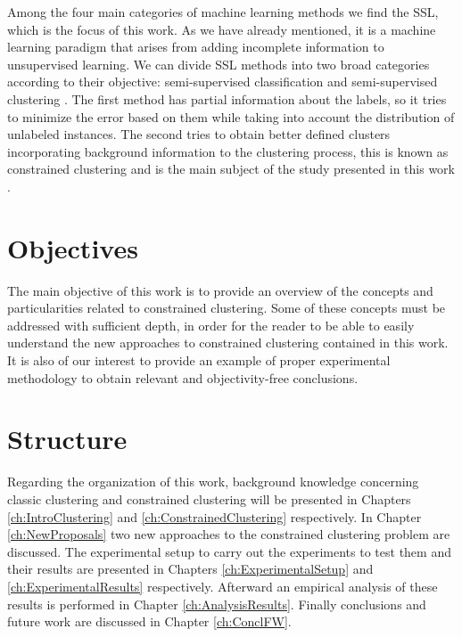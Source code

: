 Among the four main categories of machine learning methods we find the \acf{SSL}, which is the focus of this work. As we have already mentioned, it is a machine learning paradigm that arises from adding incomplete information to unsupervised learning. We can divide \acs{SSL} methods into two broad categories according to their objective: semi-supervised classification and semi-supervised clustering \cite{chapelle2009semi}. The first method has partial information about the labels, so it tries to minimize the error based on them while taking into account the distribution of unlabeled instances. The second tries to obtain better defined clusters incorporating background information to the clustering process, this is known as constrained clustering and is the main subject of the study presented in this work \cite{triguero2015self}.

\section{Objectives}

The main objective of this work is to provide an overview of the concepts and particularities related to constrained clustering. Some of these concepts must be addressed with sufficient depth, in order for the reader to be able to easily understand the new approaches to constrained clustering contained in this work. It is also of our interest to provide an example of proper experimental methodology to obtain relevant and objectivity-free conclusions.

\section{Structure}

Regarding the organization of this work, background knowledge concerning classic clustering and constrained clustering will be presented in Chapters \ref{ch:IntroClustering} and \ref{ch:ConstrainedClustering} respectively. In Chapter \ref{ch:NewProposals} two new approaches to the constrained clustering problem are discussed. The experimental setup to carry out the experiments to test them and their results are presented in Chapters \ref{ch:ExperimentalSetup} and \ref{ch:ExperimentalResults} respectively. Afterward an empirical analysis of these results is performed in Chapter \ref{ch:AnalysisResults}. Finally conclusions and future work are discussed in Chapter \ref{ch:ConclFW}.
































